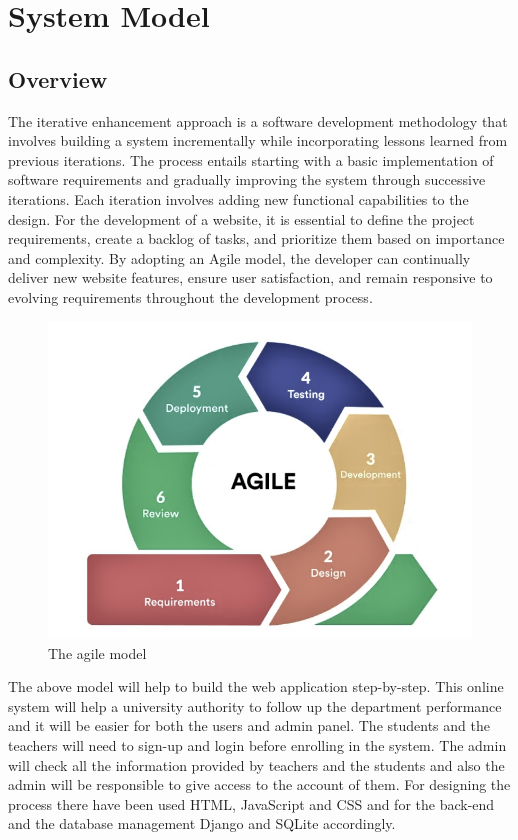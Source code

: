 \chapter{System Model}

\section{Overview}
The iterative enhancement approach is a software development methodology that involves building a system incrementally while incorporating lessons learned from previous iterations. The process entails starting with a basic implementation of software requirements and gradually improving the system through successive iterations. Each iteration involves adding new functional capabilities to the design. For the development of a website, it is essential to define the project requirements, create a backlog of tasks, and prioritize them based on importance and complexity. By adopting an Agile model, the developer can continually deliver new website features, ensure user satisfaction, and remain responsive to evolving requirements throughout the development process.\\
\begin{figure}[H]
    \centering
    \includegraphics[scale=.6]{img/agile.png}
    \caption{The agile model}
    \label{fig:agile}
\end{figure}
The above model will help to build the web application step-by-step. This online system will help a university authority to follow up the department performance and it will be easier for both the users and admin panel. The students and the teachers will need to sign-up and login before enrolling in the system. The admin will check all the information provided by teachers and the students and also the admin will be responsible to give access to the account of them. For designing the process there have been used HTML, JavaScript and CSS and for the back-end and the database management Django and SQLite accordingly.\\



